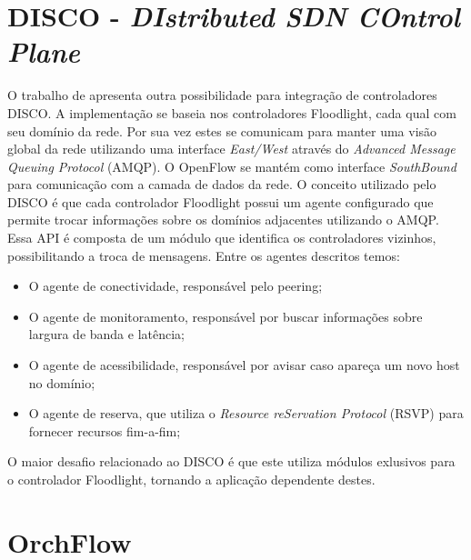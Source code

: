 \section{DISCO - \emph{DIstributed SDN COntrol Plane} }

O trabalho de  apresenta outra possibilidade para integração de controladores DISCO. A implementação se baseia nos controladores Floodlight, cada qual com seu domínio da rede. Por sua vez estes se comunicam para manter uma visão global da rede utilizando uma interface \emph{East/West} através do \emph{Advanced Message Queuing Protocol} (AMQP)\cite{amqp}. O OpenFlow se mantém como interface \emph{SouthBound} para comunicação com a camada de dados da rede.
    O conceito utilizado pelo DISCO é que cada controlador Floodlight possui um agente configurado que permite trocar informações sobre os domínios adjacentes utilizando o AMQP. Essa API é composta de um módulo que identifica os controladores vizinhos, possibilitando a troca de mensagens. Entre os agentes descritos temos:
    
    \begin{itemize}
        \item O agente de conectividade, responsável pelo peering;
        \item O agente de monitoramento, responsável por buscar informações sobre largura de banda e latência;
        \item O agente de acessibilidade, responsável por avisar caso apareça um novo host no domínio;
        \item O agente de reserva, que utiliza o \emph{Resource reServation Protocol} (RSVP) para
        fornecer recursos fim-a-fim;
    \end{itemize}

O maior desafio relacionado ao DISCO é que este utiliza módulos exlusivos para o controlador Floodlight, tornando a aplicação dependente destes.

\section{OrchFlow}

